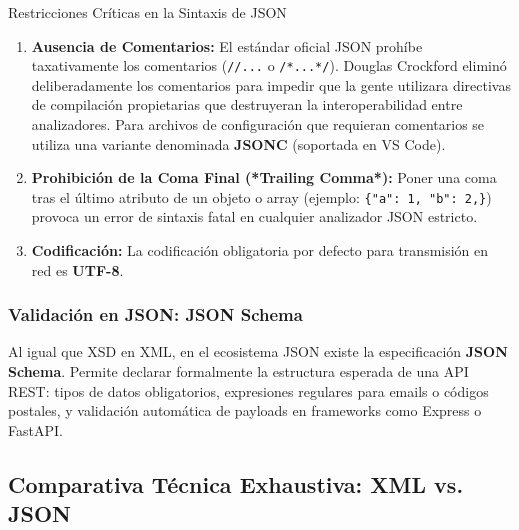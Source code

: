 \begin{importante}{Restricciones Críticas en la Sintaxis de JSON}
\begin{enumerate}
  \item \textbf{Ausencia de Comentarios:} El estándar oficial JSON prohíbe taxativamente los comentarios (\texttt{//...} o \texttt{/*...*/}). Douglas Crockford eliminó deliberadamente los comentarios para impedir que la gente utilizara directivas de compilación propietarias que destruyeran la interoperabilidad entre analizadores. Para archivos de configuración que requieran comentarios se utiliza una variante denominada \textbf{JSONC} (soportada en VS Code).
  \item \textbf{Prohibición de la Coma Final (*Trailing Comma*):} Poner una coma tras el último atributo de un objeto o array (ejemplo: \texttt{\{"a": 1, "b": 2,\}}) provoca un error de sintaxis fatal en cualquier analizador JSON estricto.
  \item \textbf{Codificación:} La codificación obligatoria por defecto para transmisión en red es \textbf{UTF-8}.
\end{enumerate}
\end{importante}

\subsubsection{Validación en JSON: JSON Schema}
Al igual que XSD en XML, en el ecosistema JSON existe la especificación \textbf{JSON Schema}. Permite declarar formalmente la estructura esperada de una API REST: tipos de datos obligatorios, expresiones regulares para emails o códigos postales, y validación automática de payloads en frameworks como Express o FastAPI.

\subsection{Comparativa Técnica Exhaustiva: XML vs. JSON}

